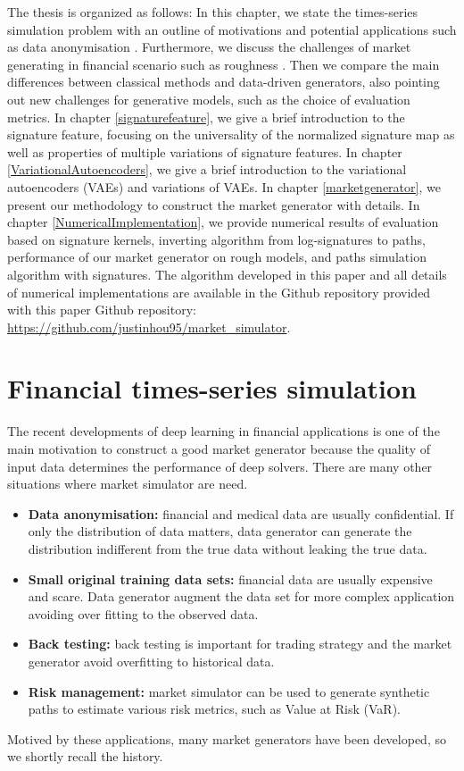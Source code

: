 \documentclass[12pt]{report}
\theoremstyle{definition}
\theoremstyle{remark}
\begin{document}
The thesis is organized as follows: In this chapter, we state the times-series simulation problem with an outline of motivations and potential applications such as data anonymisation \cite{kondratyev2020data}. Furthermore, we discuss the challenges of market generating in financial scenario such as roughness \cite{gatheral2018volatility}. Then we compare the main differences between classical methods and data-driven generators, also pointing out new challenges for generative models, such as the choice of evaluation metrics. In chapter \ref{signaturefeature}, we give a brief introduction to the signature feature, focusing on the universality of the normalized signature map \cite{chevyrev2018signature} as well as properties of multiple variations of signature features. In chapter \ref{VariationalAutoencoders}, we give a brief introduction to the variational autoencoders (VAEs) \cite{kingma2013auto} and variations of VAEs. In chapter \ref{marketgenerator}, we present our methodology to construct the market generator with details. In chapter \ref{NumericalImplementation}, we provide numerical results of evaluation based on signature kernels, inverting algorithm from log-signatures to paths, performance of our market generator on rough models, and paths simulation algorithm with signatures. The algorithm developed in this paper and all details of numerical implementations are available in the Github repository provided with this paper Github repository: \url{https://github.com/justinhou95/market_simulator}.

\section{Financial times-series simulation}
The recent developments of deep learning in financial applications is one of the main motivation to construct a good market generator because the quality of input data determines the performance of deep solvers. There are many other situations where market simulator are need.
\begin{itemize}
  \item  \textbf{Data anonymisation:} financial and medical data are usually confidential. If only the distribution of data matters, data generator can generate the distribution indifferent from the true data without leaking the true data. 
  \item \textbf{Small original training data sets:} financial data are usually expensive and scare. Data generator augment the data set for more complex application avoiding over fitting to the observed data.
  \item \textbf{Back testing:} back testing is important for trading strategy and the market generator avoid overfitting to historical data.
  \item \textbf{Risk management:} market simulator can be used to generate synthetic paths to estimate various risk metrics, such as Value at Risk (VaR).
\end{itemize}
Motived by these applications, many market generators have been developed, so we shortly recall the history.
\end{document}
